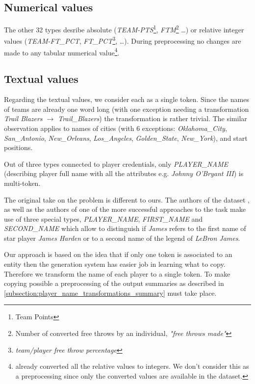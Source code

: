\subsection{Numerical values}

The other 32 types desribe absolute (\emph{TEAM-PTS}\footnote{Team Points}, \emph{FTM}\footnote{Number of converted free throws by an individual, \emph{"free throws made"}} \dots) or relative integer values (\emph{TEAM-FT\_PCT}, \emph{FT\_PCT}\footnote{\emph{team/player free throw percentage}}, \dots). During preprocessing no changes are made to any tabular numerical value\footnote{\citet{wiseman2017} already converted all the relative values to integers. We don't consider this as a preprocessing since only the converted values are available in the dataset.}.

\subsection{Textual values} \label{subsection:table_text_transformations}

Regarding the textual values, we consider each as a single token. Since the names of teams are already one word long (with one exception needing a transformation \emph{Trail Blazers $\rightarrow$ Trail\_Blazers}) the transformation is rather trivial. The similar observation applies to names of cities (with 6 exceptions: \emph{Oklahoma\_City}, \emph{San\_Antonio}, \emph{New\_Orleans}, \emph{Los\_Angeles}, \emph{Golden\_State}, \emph{New\_York}), and start positions.

Out of three types connected to player credentials, only \emph{PLAYER\_NAME} (describing player full name with all the attributes e.g. \emph{Johnny O'Bryant III}) is multi-token.

The original take on the problem is different to ours. The authors of the dataset \citep{wiseman2017}, as well as the authors of one of the more successful approaches to the task \citep{puduppully2019datatotext} make use of three special types, \emph{PLAYER\_NAME}, \emph{FIRST\_NAME} and \emph{SECOND\_NAME} which allow to distinguish if \emph{James} refers to the first name of star player \emph{James Harden} or to a second name of the legend of \emph{LeBron James}.

Our approach is based on the idea that if only one token is associated to an entity then the generation system has easier job in learning what to copy. Therefore we transform the name of each player to a single token. To make copying possible a preprocessing of the output summaries as described in \ref{subsection:player_name_transformations_summary} must take place.

